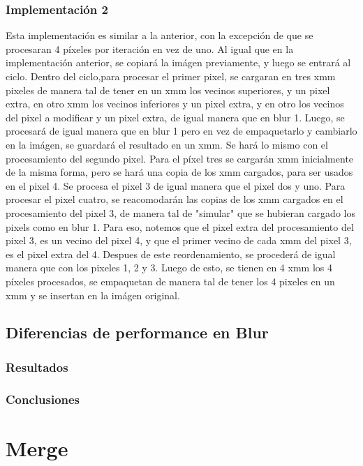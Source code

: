 \documentclass[a4paper]{article}
\begin{document}
\subsubsection{Implementación 2}

Esta implementación es similar a la anterior, con la excepción de que se procesaran 4 píxeles por iteración en vez de uno. Al igual que en la implementación anterior, se copiará la imágen previamente, y luego se entrará al ciclo. Dentro del ciclo,para procesar el primer pixel, se cargaran en tres xmm pixeles de manera tal de tener en un xmm los vecinos superiores, y un pixel extra, en otro xmm los vecinos inferiores y un pixel extra, y en otro los vecinos del pixel a modificar y un pixel extra, de igual manera que en blur 1. Luego, se procesará de igual manera que en blur 1 pero en vez de empaquetarlo y cambiarlo en la imágen, se guardará el resultado en un xmm. Se hará lo mismo con el procesamiento del segundo pixel. Para el píxel tres se cargarán xmm inicialmente de la misma forma, pero se hará una copia de los xmm cargados, para ser usados en el pixel 4. Se procesa el pixel 3 de igual manera que el pixel dos y uno. Para procesar el pixel cuatro, se reacomodarán las copias de los xmm cargados en el procesamiento del pixel 3, de manera tal de "simular" que se hubieran cargado los pixels como en blur 1. Para eso, notemos que el pixel extra del procesamiento del pixel 3, es un vecino del pixel 4, y que el primer vecino de cada xmm del pixel 3, es el pixel extra del 4. Despues de este reordenamiento, se procederá de igual manera que con los pixeles 1, 2 y 3.
Luego de esto, se tienen en 4 xmm los 4 píxeles procesados, se empaquetan de manera tal de tener los 4 pixeles en un xmm y se insertan en la imágen original.

\subsection{Diferencias de performance en Blur}


\subsubsection{Resultados}


\subsubsection{Conclusiones}


\newpage
\section{Merge}
\end{document}

